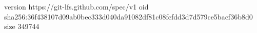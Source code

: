 version https://git-lfs.github.com/spec/v1
oid sha256:36f438107d09ab0bec333d040da91082df81c08fcfdd3d7d579ce5bacf36b8d0
size 349744
